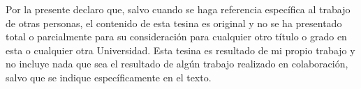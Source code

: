 
\begin{declaration}

Por la presente declaro que, salvo cuando se haga referencia específica al trabajo de otras personas, el contenido de esta tesina es original y no se ha presentado total o parcialmente para su consideración para cualquier otro título o grado en esta o cualquier otra Universidad. Esta tesina es resultado de mi propio trabajo y no incluye nada que sea el resultado de algún trabajo realizado en colaboración, salvo que se indique específicamente en el texto. 


\end{declaration}
